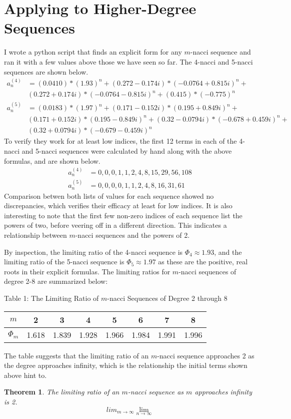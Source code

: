 \documentclass[11pt]{article}
\newtheorem{theorem}{Theorem}[section]
\begin{document}
\section{Applying to Higher-Degree Sequences}
I wrote a python script that finds an explicit form for any \(m\)-nacci sequence and ran it with a few values above those we have seen so far. The 4-nacci and 5-nacci sequences are shown below. 
\begin{align*}
    a_n^{(4)} &= (0.0410)*(1.93)^n + (0.272 - 0.174i)*(-0.0764 + 0.815i)^n + \\ &(0.272 + 0.174i)*(-0.0764 - 0.815i)^n + (0.415)*(-0.775)^n \\
    a_n^{(5)} &= (0.0183)*(1.97)^n + (0.171 - 0.152i)*(0.195 + 0.849i)^n + \\ & (0.171 + 0.152i)*(0.195 - 0.849i)^n + (0.32 - 0.0794i)*(-0.678 + 0.459i)^n + \\ & (0.32 + 0.0794i)*(-0.679 - 0.459i)^n
\end{align*}
To verify they work for at least low indices, the first 12 terms in each of the 4-nacci and 5-nacci sequences were calculated by hand along with the above formulas, and are shown below. 
\begin{align*}
    a_{n}^{(4)}&= 0,0,0,1,1,2,4,8,15,29,56,108 \\
    a_{n}^{(5)}&= 0,0,0,0,1,1,2,4,8,16,31,61
\end{align*}
Comparison betwen both lists of values for each sequence showed no discrepancies, which verifies their efficacy at least for low indices. It is also interesting to note that the first few non-zero indices of each sequence list the powers of two, before veering off in a different direction. This indicates a relationship between \(m\)-nacci sequences and the powers of 2.

By inspection, the limiting ratio of the 4-nacci sequence is \(\Phi_{4}\approx1.93\), and the limiting ratio of the 5-nacci sequence is \(\Phi_{5}\approx1.97\) as these are the positive, real roots in their explicit formulas. The limiting ratios for \(m\)-nacci sequences of degree 2-8 are summarized below:
\begin{center}
    Table 1: The Limiting Ratio of \(m\)-nacci Sequences of Degree 2 through 8
    \begin{tabular}{|c|c|c|c|c|c|c|c|} 
     \hline
     \(m\) & 2 & 3 & 4 & 5 & 6 & 7 & 8 \\ 
     \hline
     \(\Phi_m\) & 1.618 & 1.839 & 1.928 & 1.966 & 1.984 & 1.991 & 1.996 \\
     \hline
    \end{tabular}
    \end{center}
The table suggests that the limiting ratio of an \(m\)-nacci sequence approaches 2 as the degree approaches infinity, which is the relationship the initial terms shown above hint to. 
\begin{theorem}
    The limiting ratio of an \(m\)-nacci sequence as \(m\) approaches infinity is 2. 
    \[lim_{m\to\infty}\lim_{n\to\infty}\]
\end{theorem}
\end{document}
